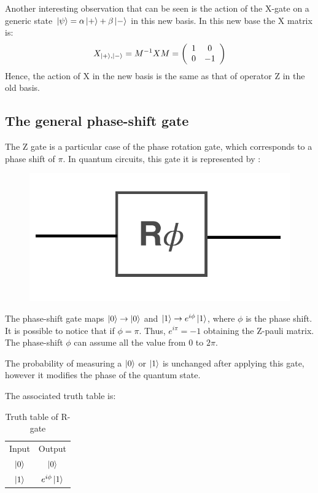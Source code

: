 Another interesting observation that can be seen is the action of the X-gate on a generic state $\ket{\psi} = \alpha \ket{+} + \beta \ket{-}$ in this new basis. In this new base the X matrix is: 
\begin{equation*}
    X_{\ket{+},\ket{-}} = M^{-1}X M = \left(\begin{array}{cc}
1 & 0 \\
0 & -1
\end{array}\right)  
\end{equation*}
Hence, the action of X in the new basis is the same as that of operator Z in the old basis.


\subsection*{The general phase-shift gate}
The Z gate is a particular case of the phase rotation gate, which corresponds to a phase shift of $\pi$. In quantum circuits, this gate it is represented by :
\begin{figure}[H]
\centering
\includegraphics[scale=0.15]{Mainmatter/images/Phase_shift_gate.png}
\end{figure}
The phase-shift gate maps $\ket{0} \to \ket{0}$ and $\ket{1} \to e^{i\phi}\ket{1}$, where $\phi$ is the phase shift. It is possible to notice that if $\phi=\pi$. Thus, $e^{i\pi}=-1$ obtaining the Z-pauli matrix. The phase-shift $\phi$ can assume all the value from 0 to $2\pi$.

The probability of measuring a $\ket{0}$ or $\ket{1}$ is unchanged after applying this gate, however it modifies the phase of the quantum state.

The associated truth table is: 
\begin{table}[h!]
    \centering
    \begin{tabular}{c|c}
         Input & Output \\
          $\ket{0}$ & $\ket{0}$ \\
          $\ket{1}$ & $e^{i\phi}\ket{1}$
    \end{tabular}
    \caption{Truth table of R-gate}
    \label{tab:rotationgate}
\end{table}

